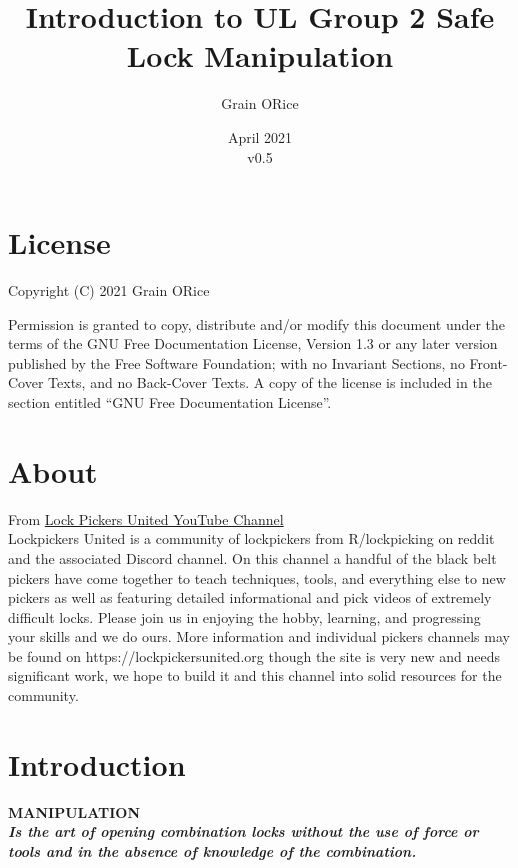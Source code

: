 \documentclass[11pt, letterpaper]{article}
\begin{document}
\title{Introduction to UL Group 2 Safe Lock Manipulation}
\author{Grain ORice}
\date{April 2021\\
  {\color{blue}v0.5}}
\maketitle

\section*{License}
Copyright (C)  2021  Grain ORice

\noindent Permission is granted to copy, distribute and/or modify this document
under the terms of the GNU Free Documentation License, Version 1.3
or any later version published by the Free Software Foundation;
with no Invariant Sections, no Front-Cover Texts, and no Back-Cover Texts.
A copy of the license is included in the section entitled
``GNU Free Documentation License''.

\section*{About}
From \href{https://www.youtube.com/channel/UCHEPEHbo6kAxsxvIePE9kRw/about}{Lock
  Pickers United YouTube Channel} \\
Lockpickers United is a community of lockpickers from R/lockpicking on reddit
and the associated Discord channel. On this channel a handful of the black belt
pickers have come together to teach techniques, tools, and everything else to
new pickers as well as featuring detailed informational and pick videos of
extremely difficult locks. Please join us in enjoying the hobby, learning,
and progressing your skills and we do ours. More information and individual
pickers channels may be found on https://lockpickersunited.org though the site
is very new and needs significant work, we hope to build it and this channel
into solid resources for the community.
\newpage

\section*{Introduction}
\begin{center}
  \textbf{MANIPULATION \\
    \textit{Is the art of opening combination locks without the use of force
      or tools and in the absence of knowledge of the combination.}}
\end{center}
\end{document}
